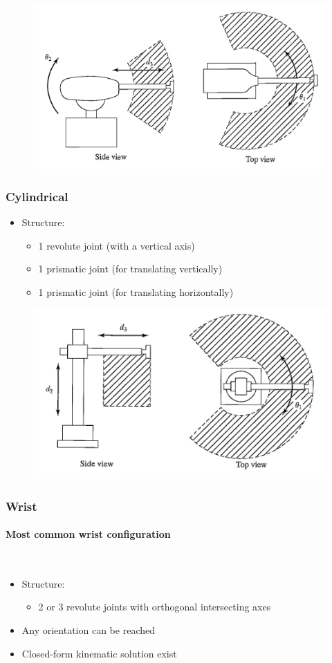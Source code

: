 \documentclass[10pt,a4paper]{article}
\begin{document}
\begin{figure}[H]
	\includegraphics[width=0.5\columnwidth]{imgs/man_spherical.png}
\end{figure}

\subsubsection{Cylindrical}
\begin{itemize}
	\item Structure:
	\begin{itemize}
		\item 1 revolute joint (with a vertical axis)
		\item 1 prismatic joint (for translating vertically)
		\item 1 prismatic joint (for translating horizontally)
	\end{itemize}
\end{itemize}

\begin{figure}[H]
	\includegraphics[width=0.5\columnwidth]{imgs/man_cylindrical.png}
\end{figure}

\subsubsection{Wrist}
\paragraph{Most common wrist configuration} ~\\
\begin{itemize}
	\item Structure:
	\begin{itemize}
		\item 2 or 3 revolute joints with orthogonal intersecting axes
	\end{itemize}
	\item Any orientation can be reached
	\item Closed-form kinematic solution exist
\end{itemize}
\end{document}
